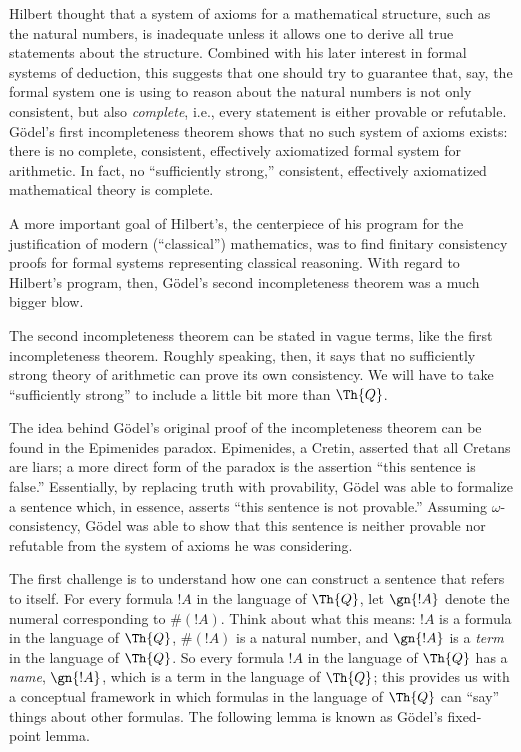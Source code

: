 \documentclass[../../include/open-logic-section]{subfiles}
\begin{document}


Hilbert thought that a system of axioms for a mathematical structure,
such as the natural numbers, is inadequate unless it allows one to
derive all true statements about the structure. Combined with his
later interest in formal systems of deduction, this suggests that one
should try to guarantee that, say, the formal system one is using to
reason about the natural numbers is not only consistent, but also
\emph{complete}, i.e., every statement is either provable or
refutable. G\"odel's first incompleteness theorem shows that no such
system of axioms exists: there is no complete, consistent, effectively
axiomatized formal system for arithmetic.  In fact, no ``sufficiently
strong,'' consistent, effectively axiomatized mathematical theory is
complete.

A more important goal of Hilbert's, the centerpiece of his program for
the justification of modern (``classical'') mathematics, was to find
finitary consistency proofs for formal systems representing classical
reasoning.  With regard to Hilbert's program, then, G\"odel's second
incompleteness theorem was a much bigger blow.

The second incompleteness theorem can be stated in vague terms, like
the first incompleteness theorem. Roughly speaking, then, it says that
no sufficiently strong theory of arithmetic can prove its own
consistency. We will have to take
``sufficiently strong'' to include a little bit more than $\Th{Q}$.

The idea behind G\"odel's original proof of the incompleteness
theorem can be found in the Epimenides paradox. Epimenides, a Cretin,
asserted that all Cretans are liars; a more direct form of the paradox
is the assertion ``this sentence is false.'' Essentially, by replacing
truth with provability, G\"odel was able to formalize a sentence
which, in essence, asserts ``this sentence is not provable.'' Assuming
$\omega$-consistency, G\"odel was able to show that this sentence is
neither provable nor refutable from the system of axioms he was
considering.

The first challenge is to understand how one can construct a sentence
that refers to itself. For every formula $!A$ in the language of $\Th{Q}$,
let $\gn{!A}$ denote the numeral corresponding to $\#(!A)$. Think
about what this means: $!A$ is a formula in the language of $\Th{Q}$,
$\#(!A)$ is a natural number, and $\gn{!A}$ is a \emph{term} in the
language of $\Th{Q}$. So every formula $!A$ in the language of $\Th{Q}$ has a
\emph{name}, $\gn{!A}$, which is a term in the language of $\Th{Q}$; this
provides us with a conceptual framework in which formulas in the
language of $\Th{Q}$ can ``say'' things about other formulas. The following
lemma is known as G\"odel's fixed-point lemma.
\end{document}
